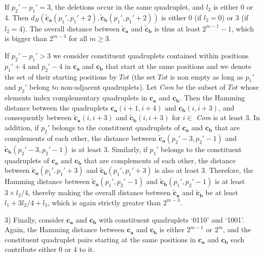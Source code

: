 If $p_2'-p_1'=3$, the deletions occur in the same quadruplet, and
$l_2$ is either 0 or 4. Then
$d_H\left(\mathbf{\tilde{c}_a}(p_1',p_1'+2),\mathbf{\tilde{c}_b}(p_1',p_1'+2)\right)$
is either 0 (if $l_2 = 0$) or 3 (if $l_2 = 4$).
The overall distance between
$\mathbf{\tilde{c}_a}$ and $\mathbf{\tilde{c}_b}$ is thus at least
$2^{m-1}-1$, which is bigger than $2^{m-3}$ for all $m \geq 3$.

If $p_2'-p_1'>3$ we consider constituent quadruplets contained
within positions $p_1'+4$ and $p_2'-4$ in $\mathbf{c_a}$ and
$\mathbf{c_b}$ that start at the same positions and we denote the
set of their starting positions by $Tot$ (the set $Tot$ is non
empty as long as $p_1'$ and $p_2'$ belong to non-adjacent
quadruplets). Let \textit{Com} be the subset of $Tot$ whose
elements index complementary quadruplets in $\mathbf{c_a}$ and
$\mathbf{c_b}$. Then the Hamming distance between the quadruplets
$\mathbf{c_a}(i+1,i+4)$ and $\mathbf{c_b}(i,i+3)$, and
consequently between $\mathbf{\tilde{c}_a}(i,i+3)$ and
$\mathbf{\tilde{c}_b}(i,i+3)$ for $i \in$ \textit{Com} is at least
3. In addition, if $p_2'$ belongs to the constituent quadruplets
of $\mathbf{c_a}$ and $\mathbf{c_b}$ that are complements of each
other, the distance between $\mathbf{\tilde{c}_a}(p_2'-3,p_2'-1)$
and $\mathbf{\tilde{c}_b}(p_2'-3,p_2'-1)$ is at least 3.
Similarly, if $p_1'$ belongs to the constituent quadruplets of
$\mathbf{c_a}$ and $\mathbf{c_b}$ that are complements of each
other, the distance between $\mathbf{\tilde{c}_a}(p_1',p_1'+3)$
and $\mathbf{\tilde{c}_b}(p_1',p_1'+3)$ is also at least 3.
Therefore, the Hamming distance between
$\mathbf{\tilde{c}_a}(p_1',p_2'-1)$ and
$\mathbf{\tilde{c}_b}(p_1',p_2'-1)$ is at least $3\times l_2/4$,
thereby making the overall distance between $\mathbf{\tilde{c}_a}$
and $\mathbf{\tilde{c}_b}$ be at least $l_1+3l_2/4+l_3$, which is
again strictly greater than $2^{m-3}$.




3) Finally, consider $\mathbf{c_a}$ and $\mathbf{c_b}$ with
constituent quadruplets `0110' and `1001'. Again, the Hamming
distance between $\mathbf{c_a}$ and $\mathbf{c_b}$ is either
$2^{m-1}$ or $2^m$, and the constituent quadruplet pairs starting
at the same positions in $\mathbf{c_a}$ and $\mathbf{c_b}$ each
contribute either 0 or 4 to it.

